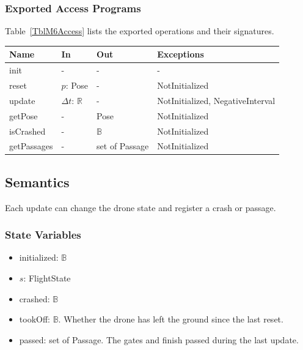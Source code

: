 \documentclass[12pt, titlepage]{article}
\begin{document}
\subsubsection{Exported Access Programs}

Table~\ref{TblM6Access} lists the exported operations and their signatures.

\begin{center}
\begin{minipage}{\textwidth}
\begin{tabularx}{\textwidth}{p{3cm} p{2.4cm} p{3cm} X}
\toprule
\textbf{Name} & \textbf{In} & \textbf{Out} & \textbf{Exceptions} \\
\midrule
init & - & - & - \\
reset & $p$: Pose & - & NotInitialized \\
update & $\Delta t$: $\mathbb{R}$ & - & NotInitialized, NegativeInterval \\
getPose & - & Pose & NotInitialized \\
isCrashed & - & $\mathbb{B}$ & NotInitialized \\
getPassages & - & set of Passage & NotInitialized \\
\bottomrule
\end{tabularx}
\label{TblM6Access}
\end{minipage}
\end{center}

\subsection{Semantics}

Each update can change the drone state and register a crash or passage.

\subsubsection{State Variables}

\begin{itemize}
\item initialized: $\mathbb{B}$
\item $s$: FlightState
\item crashed: $\mathbb{B}$
\item tookOff: $\mathbb{B}$. Whether the drone has left the ground since the
  last reset.
\item passed: set of Passage. The gates and finish passed during the last
  update.
\end{itemize}
\end{document}
